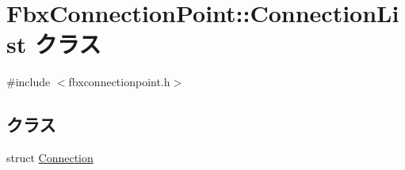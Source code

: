 \hypertarget{class_fbx_connection_point_1_1_connection_list}{}\section{Fbx\+Connection\+Point\+:\+:Connection\+List クラス}
\label{class_fbx_connection_point_1_1_connection_list}


{\ttfamily \#include $<$fbxconnectionpoint.\+h$>$}

\subsection*{クラス}
\begin{DoxyCompactItemize}
\item 
struct \hyperlink{struct_fbx_connection_point_1_1_connection_list_1_1_connection}{Connection}
\end{DoxyCompactItemize}
